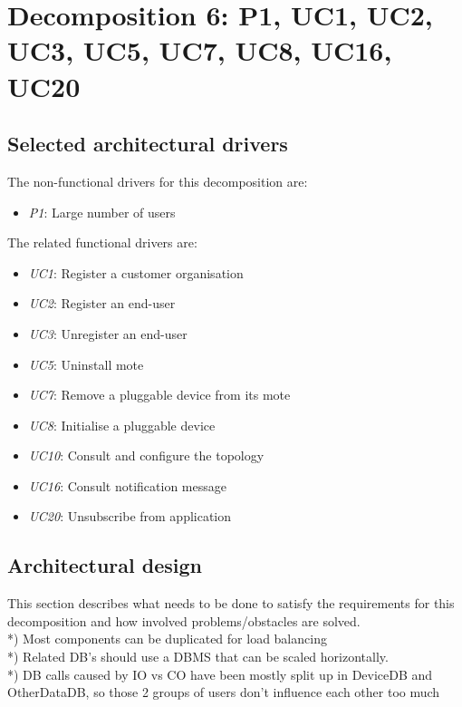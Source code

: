 \section{Decomposition 6: P1, UC1, UC2, UC3, UC5, UC7, UC8, UC16, UC20}


\subsection*{Selected architectural drivers}
    The non-functional drivers for this decomposition are:
    \begin{itemize}
    	\item \emph{P1}: Large number of users
    \end{itemize}

    The related functional drivers are:
    \begin{itemize}
        \item \emph{UC1}: Register a customer organisation
        \item \emph{UC2}: Register an end-user
        \item \emph{UC3}: Unregister an end-user
        \item \emph{UC5}: Uninstall mote
        \item \emph{UC7}: Remove a pluggable device from its mote
        \item \emph{UC8}: Initialise a pluggable device
        \item \emph{UC10}: Consult and configure the topology
        \item \emph{UC16}: Consult notification message
        \item \emph{UC20}: Unsubscribe from application
    \end{itemize}


\subsection*{Architectural design}
    This section describes what needs to be done to satisfy the requirements for
    this decomposition and how involved problems/obstacles are solved.\\

    *) Most components can be duplicated for load balancing\\
    *) Related DB's should use a DBMS that can be scaled horizontally.\\
    *) DB calls caused by IO vs CO have been mostly split up in DeviceDB and OtherDataDB, so those 2 groups of
       users don't influence each other too much\\

